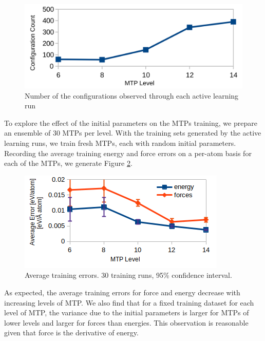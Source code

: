 \documentclass[9pt,twocolumn,twoside]{opticajnl}
\begin{document}
\begin{figure}[ht]
  \centering
  \includegraphics[width=\linewidth]{assets/levels.png}
  \caption{Number of the configurations observed through each active learning run }
  \label{fig:levels}
\end{figure}

To explore the effect of the initial parameters on the MTPs training, we prepare an ensemble of 30 MTPs per level. With the training sets generated by the active learning runs, we train fresh MTPs, each with random initial parameters. Recording the average training energy and force errors on a per-atom basis for each of the MTPs, we generate Figure \ref{fig:errors}. 

\begin{figure}[ht]
  \centering
  \includegraphics[width=\linewidth]{assets/errors.png}
  \caption{Average training errors. 30 training runs, 95\% confidence interval.}
  \label{fig:errors}
\end{figure}

As expected, the average training errors for force and energy decrease with increasing levels of MTP. We also find that for a fixed training dataset for each level of MTP, the variance due to the initial parameters is larger for MTPs of lower levels and larger for forces than energies. This observation is reasonable given that force is the derivative of energy. 
\end{document}
